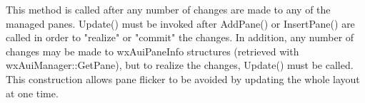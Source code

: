 \label{wxauimanagerupdate}


This method is called after any number of changes are
made to any of the managed panes. Update() must be invoked after
AddPane() or InsertPane() are called in order to "realize" or "commit"
the changes. In addition, any number of changes may be made to
wxAuiPaneInfo structures (retrieved with wxAuiManager::GetPane), but to
realize the changes, Update() must be called. This construction allows
pane flicker to be avoided by updating the whole layout at one time.

